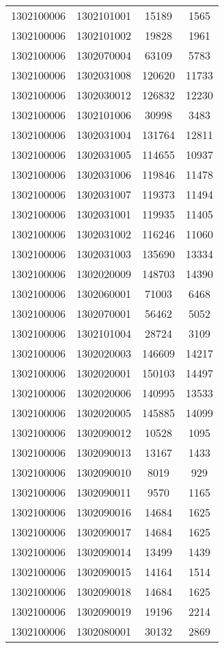 \begin{longtable}[h]{llcc}
		1302100006 & 1302101001 & 15189 & 1565\\
		1302100006 & 1302101002 & 19828 & 1961\\
		1302100006 & 1302070004 & 63109 & 5783\\
		1302100006 & 1302031008 & 120620 & 11733\\
		1302100006 & 1302030012 & 126832 & 12230\\
		1302100006 & 1302101006 & 30998 & 3483\\
		1302100006 & 1302031004 & 131764 & 12811\\
		1302100006 & 1302031005 & 114655 & 10937\\
		1302100006 & 1302031006 & 119846 & 11478\\
		1302100006 & 1302031007 & 119373 & 11494\\
		1302100006 & 1302031001 & 119935 & 11405\\
		1302100006 & 1302031002 & 116246 & 11060\\
		1302100006 & 1302031003 & 135690 & 13334\\
		1302100006 & 1302020009 & 148703 & 14390\\
		1302100006 & 1302060001 & 71003 & 6468\\
		1302100006 & 1302070001 & 56462 & 5052\\
		1302100006 & 1302101004 & 28724 & 3109\\
		1302100006 & 1302020003 & 146609 & 14217\\
		1302100006 & 1302020001 & 150103 & 14497\\
		1302100006 & 1302020006 & 140995 & 13533\\
		1302100006 & 1302020005 & 145885 & 14099\\
		1302100006 & 1302090012 & 10528 & 1095\\
		1302100006 & 1302090013 & 13167 & 1433\\
		1302100006 & 1302090010 & 8019 & 929\\
		1302100006 & 1302090011 & 9570 & 1165\\
		1302100006 & 1302090016 & 14684 & 1625\\
		1302100006 & 1302090017 & 14684 & 1625\\
		1302100006 & 1302090014 & 13499 & 1439\\
		1302100006 & 1302090015 & 14164 & 1514\\
		1302100006 & 1302090018 & 14684 & 1625\\
		1302100006 & 1302090019 & 19196 & 2214\\
		1302100006 & 1302080001 & 30132 & 2869\\

\end{longtable}
